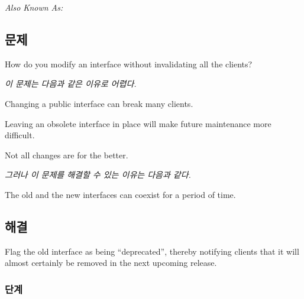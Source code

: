 \documentclass[a4paper,10pt,twoside]{book}
\begin{document}

\emph{Also Known As:}   \cite{Stev98a}


\subsection*{문제}

How do you modify an interface without invalidating all the clients?

\emph{이 문제는 다음과 같은 이유로 어렵다.}

\begin{bulletlist}
\item Changing a public interface can break many clients.

\item Leaving an obsolete interface in place will make future maintenance more difficult.

\item Not all changes are for the better.
\end{bulletlist}

\emph{그러나 이 문제를 해결할 수 있는 이유는 다음과 같다.}

\begin{bulletlist}
\item The old and the new interfaces can coexist for a period of time.
\end{bulletlist}

\subsection*{해결}

Flag the old interface as being ``deprecated'', thereby notifying clients that it will almost certainly be removed in the next upcoming release.

\subsubsection*{단계}
\end{document}
